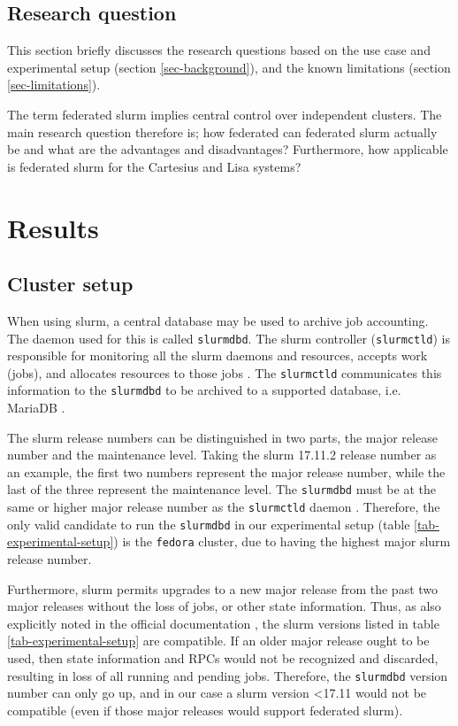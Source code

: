\documentclass[conference]{IEEEtran}
\begin{document}
\subsection{Research question}
This section briefly discusses the research questions based on the use case and experimental setup (section \ref{sec-background}), and the known limitations (section \ref{sec-limitations}).

The term federated \gls{slurm} implies central control over independent clusters. The main research question therefore is; how federated can federated \gls{slurm} actually be and what are the advantages and disadvantages? Furthermore, how applicable is federated \gls{slurm} for the Cartesius and Lisa systems?


\section{Results}
\subsection{Cluster setup}
\label{sec-cluster-setup}
When using \gls{slurm}, a central database may be used to archive job accounting. The daemon used for this is called \texttt{slurmdbd}. The \gls{slurm} controller (\texttt{slurmctld}) is responsible for monitoring all the \gls{slurm} daemons and resources, accepts work (jobs), and allocates resources to those jobs \cite{slurm-slurmctld}. The \texttt{slurmctld} communicates this information to the \texttt{slurmdbd} to be archived to a supported database, i.e. MariaDB \cite{mariadb}.

The \gls{slurm} release numbers can be distinguished in two parts, the major release number and the maintenance level. Taking the \gls{slurm} 17.11.2 release number as an example, the first two numbers represent the major release number, while the last of the three represent the maintenance level. The \texttt{slurmdbd} must be at the same or higher major release number as the \texttt{slurmctld} daemon \cite{slurm-upgrade-guide}. Therefore, the only valid candidate to run the \texttt{slurmdbd} in our experimental setup (table \ref{tab-experimental-setup}) is the \texttt{fedora} cluster, due to having the highest major \gls{slurm} release number.

Furthermore, \gls{slurm} permits upgrades to a new major release from the past two major releases without the loss of jobs, or other state information. Thus, as also explicitly noted in the official documentation \cite{slurm-upgrade-guide}, the \gls{slurm} versions listed in table \ref{tab-experimental-setup} are compatible. If an older major release ought to be used, then state information and RPCs would not be recognized and discarded, resulting in loss of all running and pending jobs. Therefore, the \texttt{slurmdbd} version number can only go up, and in our case a \gls{slurm} version \textless 17.11 would not be compatible (even if those major releases would support federated \gls{slurm}).
\end{document}

